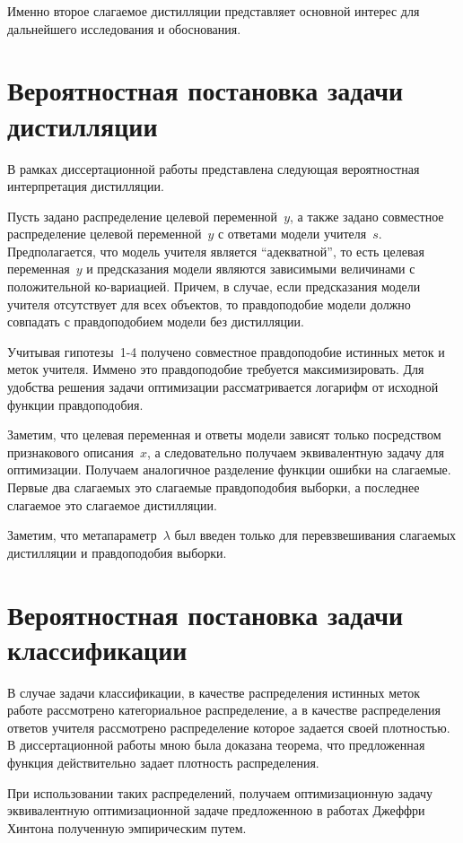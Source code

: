 \documentclass[10pt, twoside]{article}
\begin{document}
Именно второе слагаемое дистилляции представляет основной интерес для дальнейшего исследования и обоснования.

\section{Вероятностная постановка задачи дистилляции}
В рамках диссертационной работы представлена следующая вероятностная интерпретация дистилляции.

Пусть задано распределение целевой переменной~$y$, а также задано совместное распределение целевой переменной~$y$ с ответами модели учителя~$s$. Предполагается, что модель учителя является ``адекватной'', то есть целевая переменная~$y$ и предсказания модели являются зависимыми величинами с положительной ко-вариацией. Причем, в случае, если предсказания модели учителя отсутствует для всех объектов, то правдоподобие модели должно совпадать с правдоподобием модели без дистилляции.

Учитывая гипотезы~1-4 получено совместное правдоподобие истинных меток и меток учителя. Иммено это правдоподобие требуется максимизировать. Для удобства решения задачи оптимизации рассматривается логарифм от исходной функции правдоподобия.

Заметим, что целевая переменная и ответы модели зависят только посредством признакового описания~$x$, а следовательно получаем эквивалентную задачу для оптимизации. Получаем аналогичное разделение функции ошибки на слагаемые. Первые два слагаемых это слагаемые правдоподобия выборки, а последнее слагаемое это слагаемое дистилляции.

Заметим, что метапараметр~$\lambda$ был введен только для перевзвешивания слагаемых дистилляции и правдоподобия выборки.

\section{Вероятностная постановка задачи классификации}
В случае задачи классификации, в качестве распределения истинных меток  работе рассмотрено категориальное распределение, а в качестве распределения ответов учителя рассмотрено распределение которое задается своей плотностью. В диссертационной работы мною была доказана теорема, что предложенная функция действительно задает плотность распределения.

При использовании таких распределений, получаем оптимизационную задачу эквивалентную оптимизационной задаче предложенною в работах Джеффри Хинтона полученную эмпирическим путем.
\end{document}
